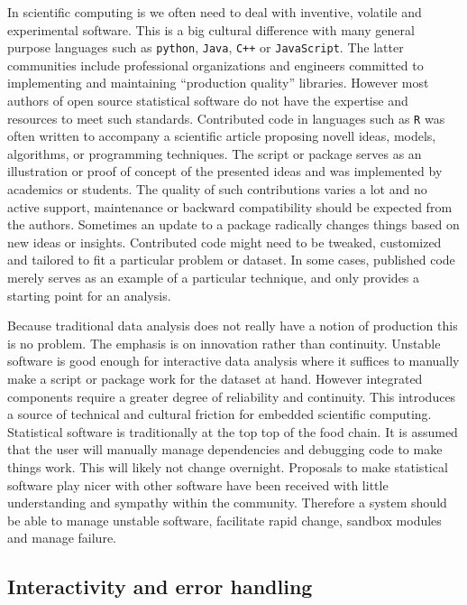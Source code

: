 \documentclass{article}
\begin{document}
In scientific computing is we often need to deal with inventive, volatile and experimental  software. This is a big cultural difference with many general purpose languages such as \texttt{python}, \texttt{Java}, \texttt{C++} or \texttt{JavaScript}. The latter communities include professional organizations and engineers committed to implementing and maintaining ``production quality'' libraries. However most authors of open source statistical software do not have the expertise and resources to meet such standards. Contributed code in languages such as \texttt{R} was often written to accompany a scientific article proposing novell ideas, models, algorithms, or programming techniques. The script or package serves as an illustration or proof of concept of the presented ideas and was implemented by academics or students. The quality of such contributions varies a lot and no active support, maintenance or backward compatibility should be expected from the authors. Sometimes an update to a package radically changes things based on new ideas or insights. Contributed code might need to be tweaked, customized and tailored to fit a particular problem or dataset. In some cases, published code merely serves as an example of a particular technique, and only provides a starting point for an analysis. 

Because traditional data analysis does not really have a notion of production this is no problem. The emphasis is on innovation rather than continuity. Unstable software is good enough for interactive data analysis where it suffices to manually make a script or package work for the dataset at hand. However integrated components require a greater degree of reliability and continuity. This introduces a source of technical and cultural friction for embedded scientific computing. Statistical software is traditionally at the top top of the food chain. It is assumed that the user will manually manage dependencies and debugging code to make things work. This will likely not change overnight. Proposals to make statistical software play nicer with other software have been received with little understanding and sympathy within the community. Therefore a system should be able to manage unstable software, facilitate rapid change, sandbox modules and manage failure.

\subsection{Interactivity and error handling}
\end{document}
